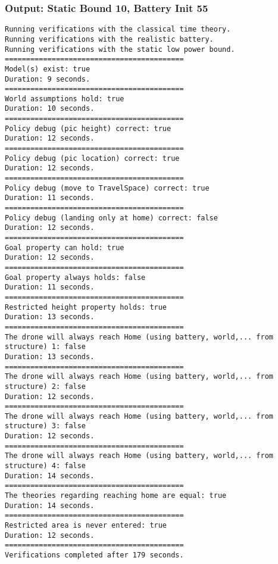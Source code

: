 \documentclass[12pt]{extarticle}
\begin{document}
\subsubsection*{Output: Static Bound 10, Battery Init 55}
\begin{lstlisting}[basicstyle=\tiny]
Running verifications with the classical time theory.
Running verifications with the realistic battery.
Running verifications with the static low power bound.
==========================================
Model(s) exist: true
Duration: 9 seconds.
==========================================
World assumptions hold: true
Duration: 10 seconds.
==========================================
Policy debug (pic height) correct: true
Duration: 12 seconds.
==========================================
Policy debug (pic location) correct: true
Duration: 12 seconds.
==========================================
Policy debug (move to TravelSpace) correct: true
Duration: 11 seconds.
==========================================
Policy debug (landing only at home) correct: false
Duration: 12 seconds.
==========================================
Goal property can hold: true
Duration: 12 seconds.
==========================================
Goal property always holds: false
Duration: 11 seconds.
==========================================
Restricted height property holds: true
Duration: 13 seconds.
==========================================
The drone will always reach Home (using battery, world,... from structure) 1: false
Duration: 13 seconds.
==========================================
The drone will always reach Home (using battery, world,... from structure) 2: false
Duration: 12 seconds.
==========================================
The drone will always reach Home (using battery, world,... from structure) 3: false
Duration: 12 seconds.
==========================================
The drone will always reach Home (using battery, world,... from structure) 4: false
Duration: 14 seconds.
==========================================
The theories regarding reaching home are equal: true
Duration: 14 seconds.
==========================================
Restricted area is never entered: true
Duration: 12 seconds.
==========================================
Verifications completed after 179 seconds.
\end{lstlisting}
\end{document}
